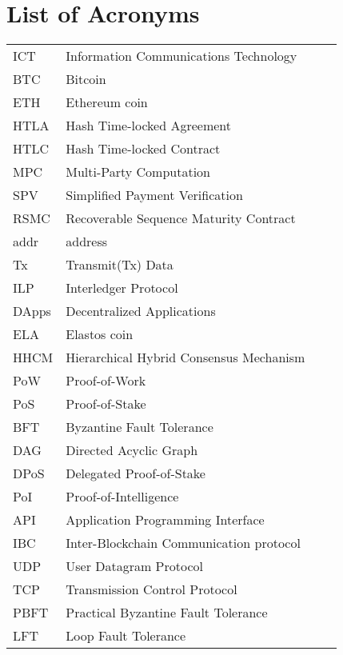 \chapter{List of Acronyms}

\begin{table}[h]
\begin{tabular}{p{2.7cm}lp{8cm}l}

ICT               & Information Communications Technology \\
BTC              & Bitcoin \\ 	
ETH              & Ethereum coin\\
HTLA             & Hash Time-locked Agreement \\
HTLC             & Hash Time-locked Contract \\ 	
MPC              & Multi-Party Computation \\
SPV              & Simplified Payment Verification \\ 	
RSMC             & Recoverable Sequence Maturity Contract \\
addr             & address\\
Tx               & Transmit(Tx) Data \\
ILP              & Interledger Protocol \\ 	
DApps            & Decentralized Applications \\
ELA              & Elastos coin\\	
HHCM             & Hierarchical Hybrid Consensus Mechanism\\
PoW              & Proof-of-Work\\
PoS              & Proof-of-Stake\\
BFT              & Byzantine Fault Tolerance\\
DAG              & Directed Acyclic Graph\\
DPoS             & Delegated Proof-of-Stake\\
PoI              & Proof-of-Intelligence\\
API              & Application Programming Interface\\
IBC              & Inter-Blockchain Communication protocol\\
UDP              & User Datagram Protocol\\
TCP              & Transmission Control Protocol\\
PBFT             & Practical Byzantine Fault Tolerance\\
LFT              & Loop Fault Tolerance\\
\end{tabular}
\end{table}